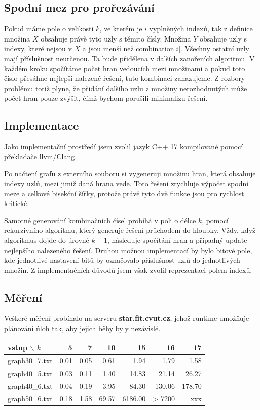 \documentclass{article}
\begin{document}
\subsection{Spodní mez pro prořezávání}
Pokud máme pole o velikosti $k$, ve kterém je $i$ vyplněných indexů, tak z definice množina $X$ obsahuje právě tyto uzly s těmito čísly.  Množina $Y$ obsahuje uzly s indexy, které nejsou v $X$ a jsou menší než combination[$i$]. Všechny ostatní uzly mají příslušnost neurčenou. Ta bude přidělena v dalších zanořeních algoritmu. V každém kroku spočítáme počet hran vedoucích mezi množinami a pokud toto číslo přesáhne nejlepší nalezené řešení, tuto kombinaci zahazujeme. Z rozbory problému totiž plyne, že přidání dalšího uzlu z množiny nerozhodnutých může počet hran pouze zvýšit, čímž bychom porušili minimalizu řešení.

\subsection{Implementace}
Jako implementační prostředí jsem zvolil jazyk C++ 17 kompilované pomocí překladače llvm/Clang.

Po načtení grafu z externího souboru si vygeneruji množinu hran, která obsahuje indexy uzlů, mezi jimiž daná hrana vede. Toto řešení zrychluje výpočet spodní meze a celkové bisekční šířky, protože právě tyto dvě funkce jsou pro rychlost kritické.

Samotné generování kombinačních čísel probíhá v poli o délce $k$, pomocí rekurzivního algoritmu, který generuje řešení průchodem do hloubky. Vždy, když algoritmus dojde do úrovně $k-1$, následuje spočítání hran a případný update nejlepšího nalezeného řešení. Druhou možnou implementací by bylo bitové pole, kde jednotlivé nastavení bitů by označovalo příslušnost uzlů do jednotlivých množin. Z implementačních důvodů jsem však zvolil reprezentaci polem indexů.

\subsection{Měření}
Veškeré měření probíhalo na serveru \textbf{star.fit.cvut.cz}, jehož runtime umožňuje plánování úloh tak, aby jejich běhy byly nezávislé.


\begin{center}
\begin{tabular}{l|*{6}{r}}
	vstup $\backslash$ $k$ & 5 & 7 & 10 & 15 & 16 & 17 \\
	\hline
	graph30\_7.txt & 0.01 & 0.05 & 0.61 & 1.94 & 1.79 & 1.58  \\
	graph40\_5.txt & 0.03 & 0.11 & 1.40 & 14.83 &  21.14 & 26.27  \\
	graph40\_6.txt & 0.04 & 0.19 & 3.95 & 84.30 &  130.06 & 178.70  \\
	graph50\_6.txt & 0.18 & 1.58 & 69.57 & 6186.00 &  > 7200 & xxx  \\
\end{tabular}
\label{table:serial}
\end{center}
\end{document}
